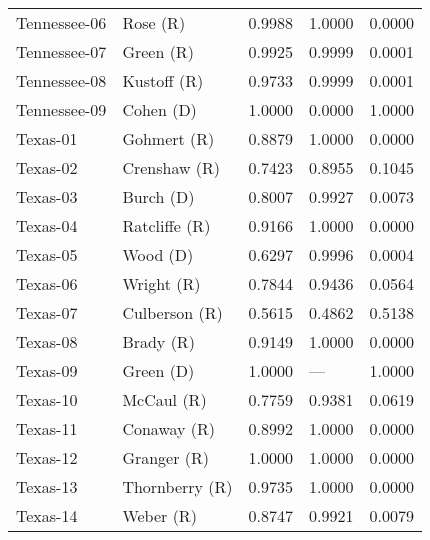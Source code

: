 \begin{longtable}{llrll}
      Tennessee-06 &              {\color{Red} Rose (R)} &       0.9988 &        1.0000 &        0.0000 \\
      Tennessee-07 &             {\color{Red} Green (R)} &       0.9925 &        0.9999 &        0.0001 \\
      Tennessee-08 &           {\color{Red} Kustoff (R)} &       0.9733 &        0.9999 &        0.0001 \\
      Tennessee-09 &            {\color{Blue} Cohen (D)} &       1.0000 &        0.0000 &        1.0000 \\
          Texas-01 &           {\color{Red} Gohmert (R)} &       0.8879 &        1.0000 &        0.0000 \\
          Texas-02 &          {\color{Red} Crenshaw (R)} &       0.7423 &        0.8955 &        0.1045 \\
          Texas-03 &            {\color{Blue} Burch (D)} &       0.8007 &        0.9927 &        0.0073 \\
          Texas-04 &         {\color{Red} Ratcliffe (R)} &       0.9166 &        1.0000 &        0.0000 \\
          Texas-05 &             {\color{Blue} Wood (D)} &       0.6297 &        0.9996 &        0.0004 \\
          Texas-06 &            {\color{Red} Wright (R)} &       0.7844 &        0.9436 &        0.0564 \\
          Texas-07 &         {\color{Red} Culberson (R)} &       0.5615 &        0.4862 &        0.5138 \\
          Texas-08 &             {\color{Red} Brady (R)} &       0.9149 &        1.0000 &        0.0000 \\
          Texas-09 &            {\color{Blue} Green (D)} &       1.0000 &           --- &        1.0000 \\
          Texas-10 &            {\color{Red} McCaul (R)} &       0.7759 &        0.9381 &        0.0619 \\
          Texas-11 &           {\color{Red} Conaway (R)} &       0.8992 &        1.0000 &        0.0000 \\
          Texas-12 &           {\color{Red} Granger (R)} &       1.0000 &        1.0000 &        0.0000 \\
          Texas-13 &        {\color{Red} Thornberry (R)} &       0.9735 &        1.0000 &        0.0000 \\
          Texas-14 &             {\color{Red} Weber (R)} &       0.8747 &        0.9921 &        0.0079 \\

\end{longtable}
